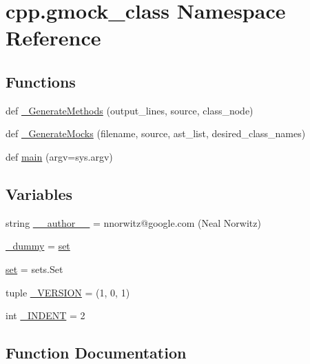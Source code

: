 \hypertarget{namespacecpp_1_1gmock__class}{}\section{cpp.\+gmock\+\_\+class Namespace Reference}
\label{namespacecpp_1_1gmock__class}
\subsection*{Functions}
\begin{DoxyCompactItemize}
\item 
def \hyperlink{namespacecpp_1_1gmock__class_ae1b91676e6a4c7ae21c3ef2394a096a1}{\+\_\+\+Generate\+Methods} (output\+\_\+lines, source, class\+\_\+node)
\item 
def \hyperlink{namespacecpp_1_1gmock__class_a3f8d5ceabb0bd6143422efeccc900ca9}{\+\_\+\+Generate\+Mocks} (filename, source, ast\+\_\+list, desired\+\_\+class\+\_\+names)
\item 
def \hyperlink{namespacecpp_1_1gmock__class_a8f99cfdd2b4f0a547d6585b1de78bac0}{main} (argv=sys.\+argv)
\end{DoxyCompactItemize}
\subsection*{Variables}
\begin{DoxyCompactItemize}
\item 
string \hyperlink{namespacecpp_1_1gmock__class_a4a765064f65186f17ff74a9ebb5d27b8}{\+\_\+\+\_\+author\+\_\+\+\_\+} = \textquotesingle{}nnorwitz@google.\+com (Neal Norwitz)\textquotesingle{}
\item 
\hyperlink{namespacecpp_1_1gmock__class_ab4128a969856897356b7956c5ba4fc01}{\+\_\+dummy} = \hyperlink{namespacecpp_1_1gmock__class_a2157e96eee0b4bf9ca6d195ab76f59c2}{set}
\item 
\hyperlink{namespacecpp_1_1gmock__class_a2157e96eee0b4bf9ca6d195ab76f59c2}{set} = sets.\+Set
\item 
tuple \hyperlink{namespacecpp_1_1gmock__class_ae5d7185c5f485142460e91de1394283c}{\+\_\+\+V\+E\+R\+S\+I\+ON} = (1, 0, 1)
\item 
int \hyperlink{namespacecpp_1_1gmock__class_aa09d38d618dd2e76366852c660a832e8}{\+\_\+\+I\+N\+D\+E\+NT} = 2
\end{DoxyCompactItemize}


\subsection{Function Documentation}
\mbox{\label{namespacecpp_1_1gmock__class_ae1b91676e6a4c7ae21c3ef2394a096a1}} 
